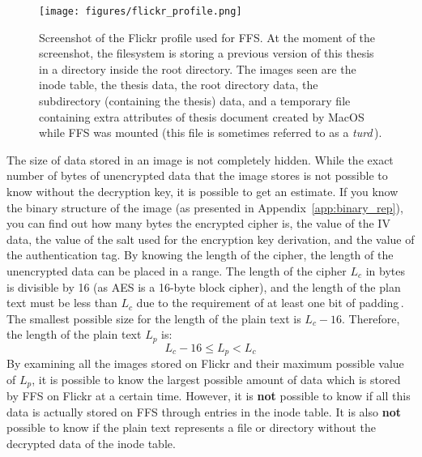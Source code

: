 \begin{figure}[!ht]
	\begin{center}
	  \texttt{[image: figures/flickr\_profile.png]}
	\end{center}
	\caption[Screenshot of the Flickr profile used for FFS]{Screenshot of the Flickr profile used for FFS. At the moment of the screenshot, the filesystem is storing a previous version of this thesis in a directory inside the root directory. The images seen are the inode table, the thesis data, the root directory data, the subdirectory (containing the thesis) data, and a temporary file containing extra attributes of thesis document created by MacOS while FFS was mounted (this file is sometimes referred to as a \textit{turd}\,\cite{geekosaurAnswerWhyAre2011}).}
	\label{fig:flickr_profile}
\end{figure}

The size of data stored in an image is not completely hidden. While the exact number of bytes of unencrypted data that the image stores is not possible to know without the decryption key, it is possible to get an estimate. If you know the binary structure of the image (as presented in Appendix~\ref{app:binary_rep}), you can find out how many bytes the encrypted cipher is, the value of the IV data, the value of the salt used for the encryption key derivation, and the value of the authentication tag. By knowing the length of the cipher, the length of the unencrypted data can be placed in a range. The length of the cipher $L_c$ in bytes is divisible by 16 (as AES is a 16-byte block cipher), and the length of the plan text must be less than $L_c$ due to the requirement of at least one bit of padding\,\cite{z.z.coderAnswerSizeData2010}. The smallest possible size for the length of the plain text is $L_c - 16$. Therefore, the length of the plain text $L_p$ is:
$$
	L_c - 16 \leq L_p < L_c
$$
By examining all the images stored on Flickr and their maximum possible value of $L_p$, it is possible to know the largest possible amount of data which is stored by FFS on Flickr at a certain time. However, it is \textbf{not} possible to know if all this data is actually stored on FFS through entries in the inode table. It is also \textbf{not} possible to know if the plain text represents a file or directory without the decrypted data of the inode table.

